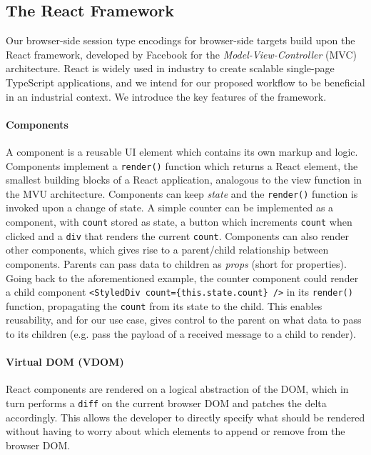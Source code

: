 \subsection{The React Framework}
Our browser-side session type encodings for browser-side targets build upon the React framework, developed by Facebook \cite{React} for the \textit{Model-View-Controller} (MVC) architecture. React is widely used in industry to create scalable single-page TypeScript
applications, and we intend for our proposed workflow to be beneficial in an
industrial context.
We introduce the key features of the framework.

\paragraph{Components}
A component is a reusable UI element which
contains its own markup and logic.
Components implement a \texttt{render()} function which returns a React
element, the smallest building blocks of a React application, analogous to the
view function in the MVU architecture.
Components can keep \textit{state} and the \texttt{render()} function is
invoked upon a change of state.
A simple counter can be implemented as a component,
with \texttt{count} stored as state, a button which increments \texttt{count}
when clicked and a \texttt{div} that renders the current
\texttt{count}.
Components can also render other components, which gives rise
to a parent/child relationship between components.
Parents can pass data to children as \textit{props} (short for properties).
Going back to the aforementioned example, the counter component could
render a child component \texttt{<StyledDiv count=\{this.state.count\} />} in
its \texttt{render()} function, propagating the \texttt{count} from its state
to the child.
This enables reusability, and for our use case, gives control to the parent
on what data to pass to its children (e.g. pass the payload of a received
message to a child to render).


\paragraph{Virtual DOM (VDOM)}
React components are rendered on a logical
abstraction of the DOM, which in turn performs a \texttt{diff} on the current
browser DOM and patches the delta accordingly.
This allows the developer to
directly specify what should be rendered without having to worry about which
elements to append or remove from the browser DOM.

